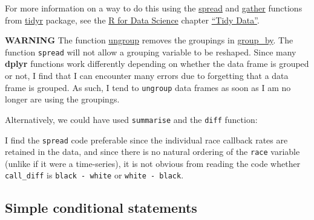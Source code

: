\documentclass[]{book}
\newenvironment{Shaded}{\begin{snugshade}}{\end{snugshade}}
\newcommand{\CommentTok}[1]{\textcolor[rgb]{0.56,0.35,0.01}{\textit{#1}}}
\newcommand{\DataTypeTok}[1]{\textcolor[rgb]{0.13,0.29,0.53}{#1}}
\newcommand{\KeywordTok}[1]{\textcolor[rgb]{0.13,0.29,0.53}{\textbf{#1}}}
\newcommand{\NormalTok}[1]{#1}
\newcommand{\OperatorTok}[1]{\textcolor[rgb]{0.81,0.36,0.00}{\textbf{#1}}}
\newcommand{\StringTok}[1]{\textcolor[rgb]{0.31,0.60,0.02}{#1}}
\theoremstyle{definition}
\theoremstyle{definition}
\theoremstyle{definition}
\theoremstyle{remark}
\begin{document}
For more information on a way to do this using the
\href{https://www.rdocumentation.org/packages/tidyr/topics/spread}{spread}
and
\href{https://www.rdocumentation.org/packages/tidyr/topics/gather}{gather}
functions from \href{https://cran.r-project.org/package=tidyr}{tidyr}
package, see the \href{http://r4ds.had.co.nz/}{R for Data Science}
chapter \href{http://r4ds.had.co.nz/tidy-data.html}{``Tidy Data''}.

\textbf{WARNING} The function
\href{https://www.rdocumentation.org/packages/dplyr/topics/ungroup}{ungroup}
removes the groupings in
\href{https://www.rdocumentation.org/packages/dplyr/topics/group_by}{group\_by}.
The function \texttt{spread} will not allow a grouping variable to be
reshaped. Since many \textbf{dplyr} functions work differently depending
on whether the data frame is grouped or not, I find that I can encounter
many errors due to forgetting that a data frame is grouped. As such, I
tend to \texttt{ungroup} data frames as soon as I am no longer are using
the groupings.

Alternatively, we could have used \texttt{summarise} and the
\texttt{diff} function:

\begin{Shaded}
\end{Shaded}

I find the \texttt{spread} code preferable since the individual race
callback rates are retained in the data, and since there is no natural
ordering of the \texttt{race} variable (unlike if it were a
time-series), it is not obvious from reading the code whether
\texttt{call\_diff} is \texttt{black\ -\ white} or
\texttt{white\ -\ black}.

\hypertarget{simple-conditional-statements}{%
\subsection{Simple conditional
statements}\label{simple-conditional-statements}}
\end{document}
